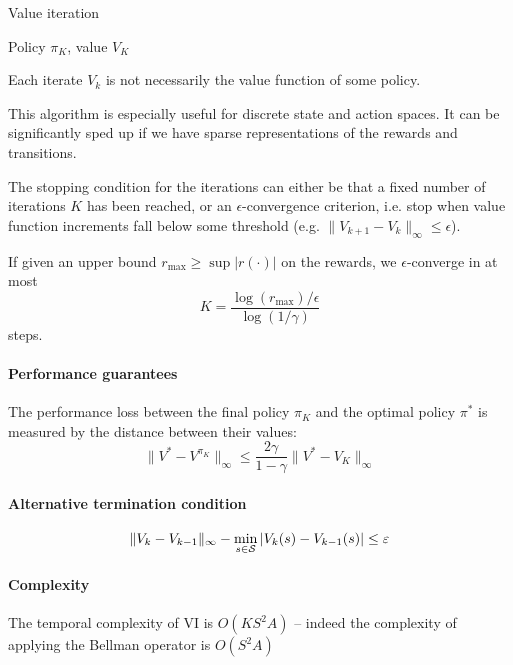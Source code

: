 \documentclass[../course-notes.tex]{subfiles}
\begin{document}
\begin{algorithm}
	\caption{Value iteration}
	\Return Policy $\pi_K$, value $V_K$\;
\end{algorithm}

\begin{remark}
Each iterate $V_k$ is not necessarily the value function of some policy.
\end{remark}

This algorithm is especially useful for discrete state and action spaces. It can be significantly sped up if we have sparse representations of the rewards and transitions.

The stopping condition for the iterations can either be that a fixed number of iterations $K$ has been reached, or an $\epsilon$-convergence criterion, i.e. stop when value function increments fall below some threshold (e.g. $\|V_{k+1} - V_k\|_{\infty} \leq \epsilon$).

\begin{prop}
	If given an upper bound $r_{\max{}} \geq \sup |r(\cdot)|$ on the rewards, we $\epsilon$-converge in at most
	\[
		K = \frac{\log(r_{\max{}})/\epsilon}{\log(1/\gamma)}
	\]
	steps.
\end{prop}

\paragraph{Performance guarantees} The performance loss between the final policy $\pi_K$ and the optimal policy $\pi^*$ is measured by the distance between their values:
\[
	\|V^* - V^{\pi_K}\|_\infty \leq
	\frac{2\gamma}{1 - \gamma} \| V^* - V_K\|_\infty
\]

\paragraph{Alternative termination condition}
\[
	\|V_k-V_{k-1}\|_\infty -
	\min_{s\in\mathcal{S}} |V_k(s) - V_{k-1}(s)| \leq \varepsilon
\]

\paragraph{Complexity} The temporal complexity of VI is $O(KS^2A)$ -- indeed the complexity of applying the Bellman operator is $O(S^2A)$
\end{document}
